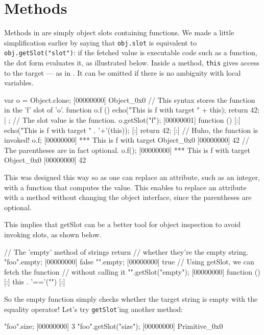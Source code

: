 \section{Methods}

Methods in \us are simply object slots containing functions. We made a
little simplification earlier by saying that \lstinline|obj.slot| is
equivalent to \lstinline|obj.getSlot("slot")|: if the fetched value is
executable code such as a function, the dot form evaluates it, as
illustrated below. Inside a method, \lstinline|this| gives access to
the target --- as in \Cxx.  It can be omitted if there is no ambiguity
with local variables.

\begin{urbiscript}
var o = Object.clone;
[00000000] Object_0x0
// This syntax stores the function in the 'f' slot of 'o'.
function o.f ()
{
  echo("This is f with target " + this);
  return 42;
} | {};
// The slot value is the function.
o.getSlot("f");
[00000001] function () {
[:]  echo("This is f with target " . '+'(this));
[:]  return 42;
[:]}
// Huho, the function is invoked!
o.f;
[00000000] *** This is f with target Object_0x0
[00000000] 42
// The parentheses are in fact optional.
o.f();
[00000000] *** This is f with target Object_0x0
[00000000] 42
\end{urbiscript}

This was designed this way so as one can replace an attribute, such as
an integer, with a function that computes the value. This enables to
replace an attribute with a method without changing the object
interface, since the parentheses are optional.

This implies that getSlot can be a better tool for object inspection
to avoid invoking slots, as shown below.

\begin{urbiscript}
// The 'empty' method of strings return
// whether they're the empty string.
"foo".empty;
[00000000] false
"".empty;
[00000000] true
// Using getSlot, we can fetch the function
// without calling it
"".getSlot("empty");
[00000000] function () {
[:]  this . '=='("")
[:]}
\end{urbiscript}

So the empty function simply checks whether the target string is empty
with the equality operator! Let's try \lstinline{getSlot}'ing another method:

\begin{urbiscript}
"foo".size;
[00000000] 3
"foo".getSlot("size");
[00000000] Primitive_0x0
\end{urbiscript}

